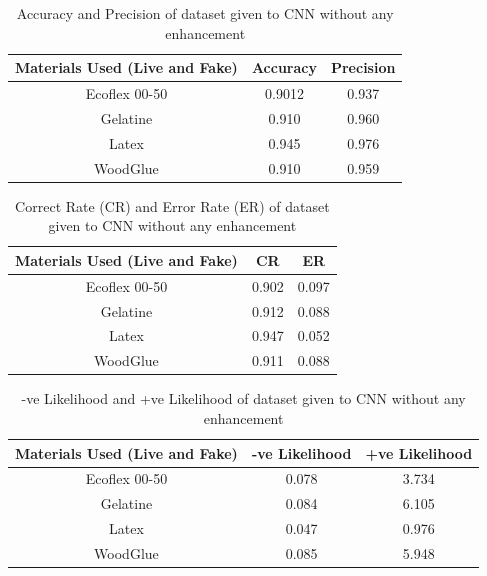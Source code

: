 \begin{table}[h]
\caption {Accuracy and Precision of dataset given to CNN without any enhancement} \label{tab:3} 
\begin{center}
\begin{tabular}{|c|c|c|} 
 \hline
 Materials Used (Live and Fake) & Accuracy & Precision\\ 
 \hline
 Ecoflex 00-50 & 0.9012 & 0.937\\
 \hline
Gelatine & 0.910 & 0.960\\
 \hline
Latex & 0.945 & 0.976\\
\hline
WoodGlue & 0.910 & 0.959\\
\hline
\end{tabular}
\end{center}
\end{table}

\begin{table}[h] 
\caption {Correct Rate (CR) and Error Rate (ER) of dataset given to CNN without any enhancement}
\label{tab:32} 
\begin{center}
\begin{tabular}{|c|c|c|}
\hline 
Materials Used (Live and Fake) & CR & ER \\ 
\hline 
Ecoflex 00-50 & 0.902 & 0.097 \\ 
\hline 
Gelatine & 0.912 & 0.088 \\ 
\hline 
Latex & 0.947 & 0.052 \\ 
\hline 
WoodGlue & 0.911 & 0.088\\ 
\hline 
\end{tabular}
\end{center}
\end{table}

\begin{table}[h] 
\caption {-ve Likelihood and +ve Likelihood of dataset given to CNN without any enhancement} \label{tab:33} 
\begin{center}
\begin{tabular}{|c|c|c|}
\hline 
Materials Used (Live and Fake) & -ve Likelihood & +ve Likelihood \\ 
\hline 
Ecoflex 00-50 & 0.078 & 3.734\\ 
\hline 
Gelatine & 0.084 & 6.105 \\ 
\hline 
Latex & 0.047 & 0.976 \\ 
\hline 
WoodGlue & 0.085 & 5.948 \\ 
\hline 
\end{tabular}
\end{center}
\end{table}

